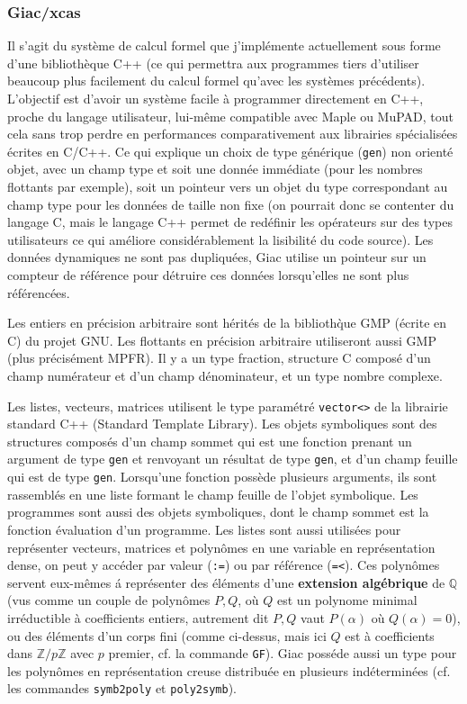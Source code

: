 \documentclass[a4paper,11pt]{article}
\newcommand{\Z}{{\mathbb{Z}}}
\newcommand{\Q}{{\mathbb{Q}}}
\begin{document}
\subsubsection{Giac/xcas}
Il s'agit du système de calcul formel que j'implémente actuellement sous 
forme d'une biblioth\`eque C++ (ce qui
permettra aux programmes tiers d'utiliser beaucoup plus facilement du 
calcul formel qu'avec les syst\`emes pr\'ec\'edents). L'objectif est 
d'avoir un syst\`eme facile \`a programmer directement en C++, proche 
du langage utilisateur, lui-m\^eme compatible avec Maple ou MuPAD, 
tout cela sans trop perdre en performances comparativement aux
librairies sp\'ecialis\'ees \'ecrites en C/C++. Ce qui explique un choix 
de type g\'en\'erique (\verb=gen=) non orient\'e objet, avec un champ type 
et soit une donn\'ee imm\'ediate (pour les nombres flottants par exemple), 
soit un pointeur vers un objet du type correspondant au champ type pour 
les donn\'ees de taille non fixe (on pourrait donc se
contenter du langage C, mais le langage C++ permet de red\'efinir 
les op\'erateurs sur des types utilisateurs ce qui
am\'eliore consid\'erablement la lisibilit\'e du code source). 
Les donn\'ees dynamiques ne sont pas dupliqu\'ees, Giac
utilise un pointeur sur un compteur de r\'ef\'erence pour d\'etruire 
ces donn\'ees lorsqu'elles ne sont plus r\'ef\'erenc\'ees.

Les entiers en pr\'ecision arbitraire sont h\'erit\'es de la biblioth\`que
GMP (\'ecrite en C) du projet GNU. Les flottants en pr\'ecision arbitraire
utiliseront aussi GMP (plus précisément MPFR).
Il y a un type fraction, structure C compos\'e d'un champ num\'erateur
et d'un champ d\'enominateur, et un type nombre complexe.

Les listes, vecteurs, matrices utilisent le type paramétré \verb|vector<>|
de la librairie standard C++ (Standard Template Library).
Les objets symboliques sont des structures compos\'es d'un champ sommet
qui est une fonction prenant un argument de type \verb|gen|
et renvoyant un r\'esultat
de type \verb|gen|, et d'un champ feuille qui est de type \verb|gen|.
Lorsqu'une fonction poss\`ede plusieurs arguments, ils sont rassembl\'es
en une liste formant le champ feuille de l'objet symbolique.
Les programmes sont aussi des objets symboliques, dont le champ
sommet est la fonction évaluation d'un programme.
Les listes sont aussi utilis\'ees pour repr\'esenter vecteurs, matrices
et polyn\^omes en une variable en repr\'esentation dense, on peut
y acc\'eder par valeur (\verb|:=|) ou par r\'ef\'erence
(\verb|=<|). Ces polyn\^omes servent eux-m\^emes \'a repr\'esenter
des \'el\'ements d'une 
{\bf extension alg\'ebrique}  de $\Q$ (vus comme
un couple de polyn\^omes $P,Q$, o\`u $Q$ est un polynome minimal
irr\'eductible \`a coefficients entiers, autrement dit $P,Q$ vaut $P(\alpha)$ 
o\`u $Q(\alpha)=0$),
ou des \'el\'ements d'un corps fini (comme ci-dessus, mais ici $Q$ est
\`a coefficients dans $\Z/p\Z$ avec $p$ premier, cf. la commande \verb|GF|).
Giac poss\'ede aussi un type pour les polyn\^omes
en repr\'esentation creuse distribu\'ee en plusieurs
ind\'etermin\'ees (cf. les commandes \verb|symb2poly| et \verb|poly2symb|).
\end{document}
